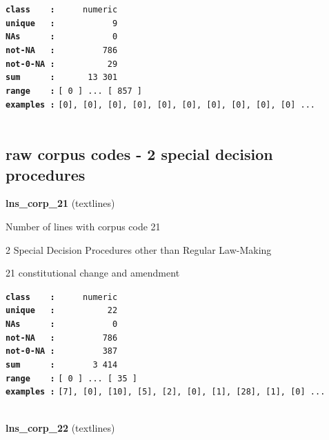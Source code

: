 \documentclass[]{article}
\begin{document}
\textbf{\texttt{class\ \ \ \ :}} \texttt{~~~~~numeric}\\
\textbf{\texttt{unique\ \ \ :}} \texttt{~~~~~~~~~~~9}\\
\textbf{\texttt{NAs\ \ \ \ \ \ :}} \texttt{~~~~~~~~~~~0}\\
\textbf{\texttt{not-NA\ \ \ :}} \texttt{~~~~~~~~~786}\\
\textbf{\texttt{not-0-NA\ :}} \texttt{~~~~~~~~~~29}\\
\textbf{\texttt{sum\ \ \ \ \ \ :}} \texttt{~~~~~~13~301}\\
\textbf{\texttt{range\ \ \ \ :}}
\texttt{{[}\ 0\ {]}\ ...\ {[}\ 857\ {]}}\\
\textbf{\texttt{examples\ :}}
\texttt{{[}0{]},\ {[}0{]},\ {[}0{]},\ {[}0{]},\ {[}0{]},\ {[}0{]},\ {[}0{]},\ {[}0{]},\ {[}0{]},\ {[}0{]}\ ...}\\

~

\subsection{raw corpus codes - 2 special decision
procedures}\label{raw-corpus-codes---2-special-decision-procedures}

\textbf{lns\_corp\_21} (textlines)

Number of lines with corpus code 21

2 Special Decision Procedures other than Regular Law-Making

21 constitutional change and amendment

\textbf{\texttt{class\ \ \ \ :}} \texttt{~~~~~numeric}\\
\textbf{\texttt{unique\ \ \ :}} \texttt{~~~~~~~~~~22}\\
\textbf{\texttt{NAs\ \ \ \ \ \ :}} \texttt{~~~~~~~~~~~0}\\
\textbf{\texttt{not-NA\ \ \ :}} \texttt{~~~~~~~~~786}\\
\textbf{\texttt{not-0-NA\ :}} \texttt{~~~~~~~~~387}\\
\textbf{\texttt{sum\ \ \ \ \ \ :}} \texttt{~~~~~~~3~414}\\
\textbf{\texttt{range\ \ \ \ :}}
\texttt{{[}\ 0\ {]}\ ...\ {[}\ 35\ {]}}\\
\textbf{\texttt{examples\ :}}
\texttt{{[}7{]},\ {[}0{]},\ {[}10{]},\ {[}5{]},\ {[}2{]},\ {[}0{]},\ {[}1{]},\ {[}28{]},\ {[}1{]},\ {[}0{]}\ ...}\\

~

\textbf{lns\_corp\_22} (textlines)
\end{document}
